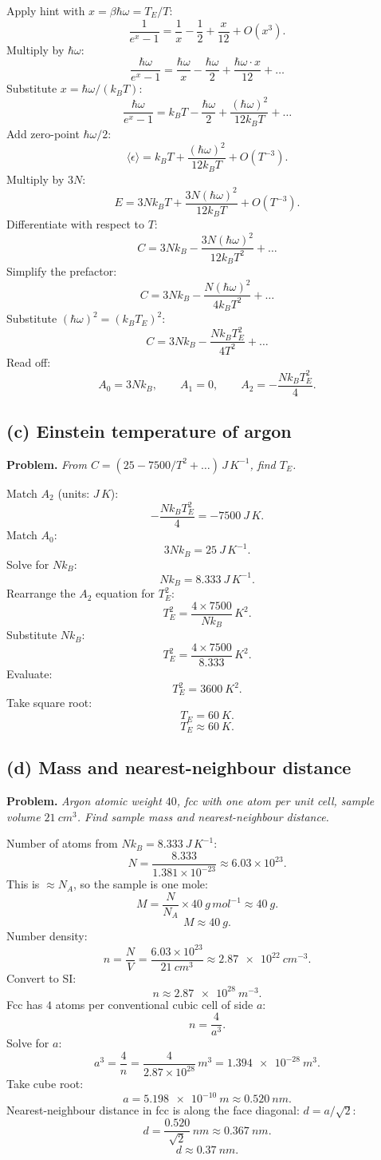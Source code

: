 \documentclass[11pt]{article}
\begin{document}
Apply hint with $x=\beta\hbar\omega=T_E/T$:
\[
\frac{1}{e^x-1} = \frac{1}{x} - \frac12 + \frac{x}{12} + O(x^3).
\]
Multiply by $\hbar\omega$:
\[
\frac{\hbar\omega}{e^x-1} = \frac{\hbar\omega}{x} - \frac{\hbar\omega}{2} + \frac{\hbar\omega \cdot x}{12} + \dots
\]
Substitute $x = \hbar\omega/(k_B T)$:
\[
\frac{\hbar\omega}{e^x-1} = k_B T - \frac{\hbar\omega}{2} + \frac{(\hbar\omega)^2}{12 k_B T} + \dots
\]
Add zero-point $\hbar\omega/2$:
\[
\langle\epsilon\rangle = k_B T + \frac{(\hbar\omega)^2}{12 k_B T} + O(T^{-3}).
\]
Multiply by $3N$:
\[
E = 3N k_B T + \frac{3N(\hbar\omega)^2}{12 k_B T} + O(T^{-3}).
\]
Differentiate with respect to $T$:
\[
C = 3Nk_B - \frac{3N(\hbar\omega)^2}{12 k_B T^2} + \dots
\]
Simplify the prefactor:
\[
C = 3Nk_B - \frac{N(\hbar\omega)^2}{4 k_B T^2} + \dots
\]
Substitute $(\hbar\omega)^2 = (k_B T_E)^2$:
\[
C = 3Nk_B - \frac{N k_B T_E^2}{4 T^2} + \dots
\]
Read off:
\[
\boxed{\;A_0 = 3Nk_B,\qquad A_1 = 0,\qquad A_2 = -\frac{N k_B T_E^2}{4}.\;}
\]

\subsection*{(c) Einstein temperature of argon}

\textbf{Problem.} \emph{From $C=(25 - 7500/T^2 + \dots)\,\si{J\,K^{-1}}$, find $T_E$.}

Match $A_2$ (units: $\si{J\,K}$):
\[
-\frac{N k_B T_E^2}{4} = -\SI{7500}{J\,K}.
\]
Match $A_0$:
\[
3 N k_B = \SI{25}{J\,K^{-1}}.
\]
Solve for $Nk_B$:
\[
N k_B = \SI{8.333}{J\,K^{-1}}.
\]
Rearrange the $A_2$ equation for $T_E^2$:
\[
T_E^2 = \frac{4\times 7500}{N k_B}\,\si{K^2}.
\]
Substitute $N k_B$:
\[
T_E^2 = \frac{4\times 7500}{8.333}\,\si{K^2}.
\]
Evaluate:
\[
T_E^2 = \SI{3600}{K^2}.
\]
Take square root:
\[
T_E = \SI{60}{K}.
\]
\[
\boxed{\;T_E \approx \SI{60}{K}.\;}
\]

\subsection*{(d) Mass and nearest-neighbour distance}

\textbf{Problem.} \emph{Argon atomic weight $40$, fcc with one atom per unit cell, sample volume $\SI{21}{cm^3}$. Find sample mass and nearest-neighbour distance.}

Number of atoms from $Nk_B=\SI{8.333}{J\,K^{-1}}$:
\[
N = \frac{8.333}{1.381\times 10^{-23}} \approx 6.03\times 10^{23}.
\]
This is $\approx N_A$, so the sample is one mole:
\[
M = \frac{N}{N_A}\times \SI{40}{g\,mol^{-1}} \approx \SI{40}{g}.
\]
\[
\boxed{\;M \approx \SI{40}{g}.\;}
\]
Number density:
\[
n = \frac{N}{V} = \frac{6.03\times 10^{23}}{\SI{21}{cm^3}} \approx \SI{2.87e22}{cm^{-3}}.
\]
Convert to SI:
\[
n \approx \SI{2.87e28}{m^{-3}}.
\]
Fcc has $4$ atoms per conventional cubic cell of side $a$:
\[
n = \frac{4}{a^3}.
\]
Solve for $a$:
\[
a^3 = \frac{4}{n} = \frac{4}{2.87\times 10^{28}}\,\si{m^3} = \SI{1.394e-28}{m^3}.
\]
Take cube root:
\[
a = \SI{5.198e-10}{m} \approx \SI{0.520}{nm}.
\]
Nearest-neighbour distance in fcc is along the face diagonal: $d = a/\sqrt 2$:
\[
d = \frac{0.520}{\sqrt 2}\,\si{nm} \approx \SI{0.367}{nm}.
\]
\[
\boxed{\;d \approx \SI{0.37}{nm}.\;}
\]
\end{document}
